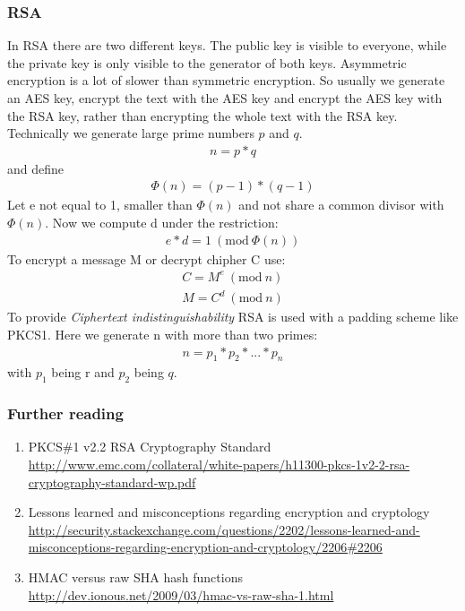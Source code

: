 \documentclass{scrartcl}
\begin{document}
\subsubsection{RSA}
In RSA there are two different keys. The public key is visible to everyone, while the private key is only visible to the generator of both keys.  Asymmetric encryption is a lot of slower than symmetric encryption. So usually we generate an AES key, encrypt the text with the AES key and encrypt the AES key with the RSA key, rather than encrypting the whole text with the RSA key.
 Technically we generate large prime numbers $p$ and $q$.
\begin{eqnarray*}
 n = p *q 
\end{eqnarray*}
 and define
\begin{eqnarray*}
 \Phi(n) = (p-1)*(q-1)
\end{eqnarray*}
 Let e not equal to 1, smaller than $ \Phi(n)$ and not share a common divisor with $ \Phi(n)$.
 Now we compute d under the restriction:
 \newcommand{\Mod}[1]{\ (\text{mod}\ #1)}
\begin{eqnarray*}
 e*d = 1 \Mod{\Phi(n)}
\end{eqnarray*}
 To encrypt a message M or decrypt chipher C use:
\begin{eqnarray*}
 C = M^e \Mod{n}\\
 M = C^d \Mod{n}
\end{eqnarray*}
 To provide \textit{Ciphertext indistinguishability} RSA is used with a padding scheme like PKCS1. Here we generate n with more than two primes:
 \begin{eqnarray*}
 n = p_1*p_2*...*p_n
\end{eqnarray*}
with $p_1$ being r and $p_2$ being $q$.
\cite{carle}

\subsubsection{Further reading}
\begin{enumerate}
\item PKCS\#1 v2.2 RSA Cryptography Standard\\\url{http://www.emc.com/collateral/white-papers/h11300-pkcs-1v2-2-rsa-cryptography-standard-wp.pdf} 
\item Lessons learned and misconceptions regarding encryption and cryptology \\\url{
http://security.stackexchange.com/questions/2202/lessons-learned-and-misconceptions-regarding-encryption-and-cryptology/2206#2206}
\item HMAC versus raw SHA hash functions \\\url{
http://dev.ionous.net/2009/03/hmac-vs-raw-sha-1.html}
\end{enumerate}
\end{document}
